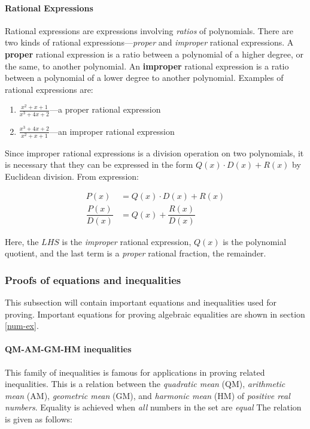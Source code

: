 \paragraph{Rational Expressions}
Rational expressions are expressions involving \emph{ratios} of polynomials.
There are two kinds of rational expressions---\emph{proper} and \emph{improper} rational expressions.
A \textbf{proper} rational expression is a ratio between a polynomial of a higher degree, or the same, to another polynomial.
An \textbf{improper} rational expression is a ratio between a polynomial of a lower degree to another polynomial.
Examples of rational expressions are:

\begin{enumerate}
  \item $\frac{x^2+x+1}{x^3+4x+2}$---a proper rational expression
  \item $\frac{x^3+4x+2}{x^2+x+1}$---an improper rational expression
\end{enumerate}

Since improper rational expressions is a division operation on two polynomials, it is necessary that they can be expressed in the form $Q(x)\cdot D(x) + R(x)$ by Euclidean division.
From expression:

\begin{align*}
  P(x) &= Q(x)\cdot D(x) + R(x) \\
  \dfrac{P(x)}{D(x)} &= Q(x) + \dfrac{R(x)}{D(x)}
\end{align*}

Here, the $LHS$ is the \emph{improper} rational expression, $Q(x)$ is the polynomial quotient, and the last term is a \emph{proper} rational fraction, the remainder.

\subsubsection{Proofs of equations and inequalities}
This subsection will contain important equations and inequalities used for proving.
Important equations for proving algebraic equalities are shown in section \ref{num-ex}.

\paragraph{QM-AM-GM-HM inequalities}
This family of inequalities is famous for applications in proving related inequalities.
This is a relation between the \emph{quadratic mean} (QM), \emph{arithmetic mean} (AM), \emph{geometric mean} (GM), and \emph{harmonic mean} (HM) of \emph{positive real numbers}.
Equality is achieved when \emph{all} numbers in the set are \emph{equal}
The relation is given as follows:

